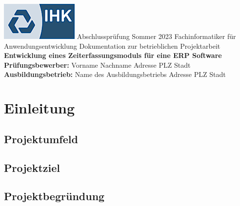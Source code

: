 \documentclass{article}
\begin{document}
\begin{titlepage}
\centering
\includegraphics[scale=1]{ihk.png}
\linebreak
\linebreak
\large{Abschlussprüfung Sommer 2023}
\linebreak
\linebreak
\large{Fachinformatiker für Anwendungsentwicklung}
\linebreak
\linebreak
\large{Dokumentation zur betrieblichen Projektarbeit}
\linebreak
\linebreak
\linebreak
\linebreak
\LARGE{\textbf{Entwicklung eines Zeiterfassungsmoduls für eine ERP Software}}
\\[1.5in]
\large{\textbf{Prüfungsbewerber:}}
\linebreak
\large{Vorname Nachname}
\linebreak
\large{Adresse}
\linebreak
\large{PLZ Stadt}
\\[0.5in]
\large{\textbf{Ausbildungsbetrieb:}}
\linebreak
\large{Name des Ausbildungsbetriebs}
\linebreak
\large{Adresse}
\linebreak
\large{PLZ Stadt}
\end{titlepage}

\newpage
\tableofcontents
\newpage

\section{Einleitung}

\subsection{Projektumfeld}

\subsection{Projektziel}

\subsection{Projektbegründung}
\end{document}
